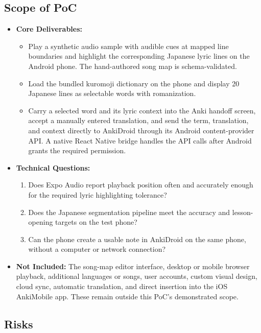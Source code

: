 \documentclass{article}
\begin{document}
\subsection{Scope of PoC}

\begin{itemize}
    \item \textbf{Core Deliverables:}
    \begin{itemize}
        \item Play a synthetic audio sample with audible cues at mapped line
        boundaries and highlight the corresponding Japanese lyric lines on the
        Android phone. The hand-authored song map is schema-validated.
        \item Load the bundled kuromoji dictionary on the phone and display
        20 Japanese lines as selectable words with romanization.
        \item Carry a selected word and its lyric context into the Anki
        handoff screen, accept a manually entered translation, and send the
        term, translation, and context directly to AnkiDroid through its
        Android content-provider API. A native React Native bridge handles the
        API calls after Android grants the required permission.
    \end{itemize}
    \item \textbf{Technical Questions:}
    \begin{enumerate}
        \item Does Expo Audio report playback position often and accurately
        enough for the required lyric highlighting tolerance?
        \item Does the Japanese segmentation pipeline meet the accuracy and
        lesson-opening targets on the test phone?
        \item Can the phone create a usable note in AnkiDroid on the
        same phone, without a computer or network connection?
    \end{enumerate}
    \item \textbf{Not Included:} The song-map editor interface, desktop or
    mobile browser playback, additional languages or songs, user accounts,
    custom visual design, cloud sync, automatic translation, and direct
    insertion into the iOS AnkiMobile app. These remain
    outside this PoC's demonstrated scope.
\end{itemize}

\subsection{Risks}
\end{document}
